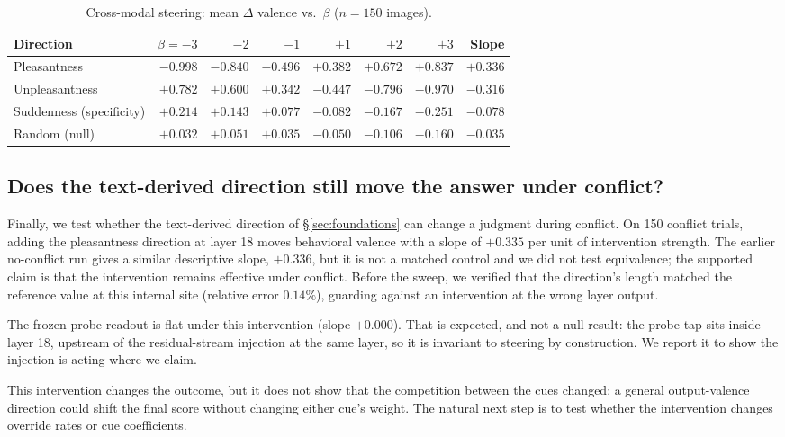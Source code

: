 \documentclass{article}
\begin{document}
\begin{table}[h]
  \caption{Cross-modal steering: mean $\Delta$ valence vs.\ $\beta$ ($n = 150$ images).}
  \label{tab:staged}
  \centering
  \small
  \begin{tabular}{lrrrrrrr}
    \toprule
    Direction & $\beta{=}{-}3$ & $-2$ & $-1$ & $+1$ & $+2$ & $+3$ & Slope \\
    \midrule
    Pleasantness   & $-0.998$ & $-0.840$ & $-0.496$ & $+0.382$ & $+0.672$ & $+0.837$ & $+0.336$ \\
    Unpleasantness & $+0.782$ & $+0.600$ & $+0.342$ & $-0.447$ & $-0.796$ & $-0.970$ & $-0.316$ \\
    Suddenness (specificity) & $+0.214$ & $+0.143$ & $+0.077$ & $-0.082$ & $-0.167$ & $-0.251$ & $-0.078$ \\
    Random (null)  & $+0.032$ & $+0.051$ & $+0.035$ & $-0.050$ & $-0.106$ & $-0.160$ & $-0.035$ \\
    \bottomrule
  \end{tabular}
\end{table}

\subsection{Does the text-derived direction still move the answer under conflict?}
\label{sec:arbitration}

Finally, we test whether the text-derived direction of \S\ref{sec:foundations} can change a judgment during conflict. On 150 conflict trials, adding the pleasantness direction at layer 18 moves behavioral valence with a slope of $+0.335$ per unit of intervention strength. The earlier no-conflict run gives a similar descriptive slope, $+0.336$, but it is not a matched control and we did not test equivalence; the supported claim is that the intervention remains effective under conflict. Before the sweep, we verified that the direction's length matched the reference value at this internal site (relative error $0.14\%$), guarding against an intervention at the wrong layer output.

The frozen probe readout is flat under this intervention (slope $+0.000$). That is expected, and not a null result: the probe tap sits inside layer 18, upstream of the residual-stream injection at the same layer, so it is invariant to steering by construction. We report it to show the injection is acting where we claim.

This intervention changes the outcome, but it does not show that the competition between the cues changed: a general output-valence direction could shift the final score without changing either cue's weight. The natural next step is to test whether the intervention changes override rates or cue coefficients.
\end{document}
